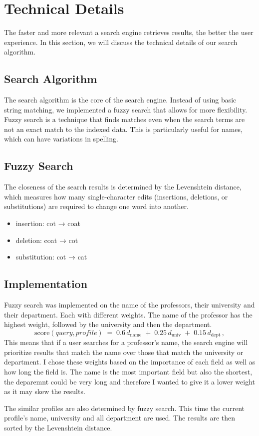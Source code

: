 \section{Technical Details}

The faster and more relevant a search engine retrieves results, the better the user experience. In this section, we will discuss the technical details of our search algorithm.

\subsection{Search Algorithm}

The search algorithm is the core of the search engine. Instead of using basic string matching, we implemented a fuzzy search that allows for more flexibility. Fuzzy search is a technique that finds matches even when the search terms are not an exact match to the indexed data. This is particularly useful for names, which can have variations in spelling.

\subsection{Fuzzy Search}

The closeness of the search results is determined by the Levenshtein distance, which measures how many single-character edits (insertions, deletions, or substitutions) are required to change one word into another.
\begin{itemize}
    \item insertion: cot → coat
    \item deletion: coat → cot
    \item substitution: cot → cat
\end{itemize}

\subsection{Implementation}

Fuzzy search was implemented on the name of the professors, their university and their department. Each with different weights. The name of the professor has the highest weight, followed by the university and then the department.
\[
  \text{score}(query, profile) \;=\; 0.6\,d_\text{name} \;+\; 0.25\,d_\text{univ} \;+\; 0.15\,d_\text{dept}\,,
\]
This means that if a user searches for a professor's name, the search engine will prioritize results that match the name over those that match the university or department. I chose these weights based on the importance of each field as well as how long the field is. The name is the most important field but also the shortest, the deparemnt could be very long and therefore I wanted to give it a lower weight as it may skew the results.

The similar profiles are also determined by fuzzy search. This time the current profile's name, university and all department are used. The results are then sorted by the Levenshtein distance.